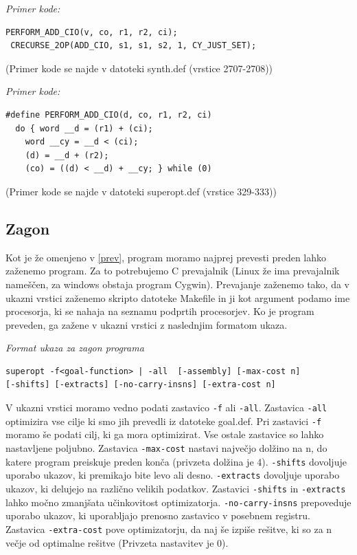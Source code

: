\documentclass[a4paper, 12pt]{book}
\begin{document}
				\medskip
				
				\noindent
				{\it Primer kode:}
				\begin{Verbatim}[baselinestretch=1]
 PERFORM_ADD_CIO(v, co, r1, r2, ci);
 CRECURSE_2OP(ADD_CIO, s1, s1, s2, 1, CY_JUST_SET);
				\end{Verbatim}
				\noindent
				{\small (Primer kode se najde v datoteki synth.def (vrstice 2707-2708))}
				\medskip
				
				\noindent
{\it Primer kode:}
\begin{Verbatim}[baselinestretch=1]
#define PERFORM_ADD_CIO(d, co, r1, r2, ci) 
  do { word __d = (r1) + (ci);                                          
    word __cy = __d < (ci);                                          
    (d) = __d + (r2);                                                
    (co) = ((d) < __d) + __cy; } while (0)
\end{Verbatim}
%
\noindent
{\small (Primer kode se najde v datoteki superopt.def (vrstice 329-333))}
	 
	\subsection{Zagon}
	Kot je že omenjeno v \ref{prev}, program moramo najprej prevesti preden lahko zaženemo program. Za to potrebujemo C prevajalnik (Linux že ima prevajalnik nameščen, za windows obstaja program Cygwin). Prevajanje zaženemo tako, da v  ukazni vrstici zaženemo skripto datoteke Makefile in ji kot argument podamo ime procesorja, ki se nahaja na seznamu podprtih procesorjev. Ko je program preveden, ga zažene v ukazni vrstici z naslednjim formatom ukaza.
	\medskip
	
	\noindent
	{\it Format ukaza za zagon programa}
\begin{Verbatim}[baselinestretch=1]
superopt -f<goal-function> | -all  [-assembly] [-max-cost n]
[-shifts] [-extracts] [-no-carry-insns] [-extra-cost n]
\end{Verbatim}

	V ukazni vrstici moramo vedno podati zastavico \texttt{-f} ali \texttt{-all}. Zastavica \texttt{-all} optimizira vse cilje ki smo jih prevedli iz datoteke goal.def. Pri zastavici \texttt{-f} moramo še podati cilj, ki ga mora optimizirat. Vse ostale zastavice so lahko nastavljene poljubno. Zastavica \texttt{-max-cost} nastavi največjo dolžino na n, do katere program preiskuje preden konča (privzeta dolžina je 4). \texttt{-shifts} dovoljuje uporabo ukazov, ki premikajo bite levo ali desno. \texttt{-extracts} dovoljuje uporabo ukazov, ki delujejo na različno velikih podatkov. Zastavici \texttt{-shifts} in \texttt{-extracts} lahko močno zmanjšata učinkovitost optimizatorja. \texttt{-no-carry-insns} prepoveduje uporabo ukazov, ki uporabljajo prenosno zastavico v posebnem registru. Zastavica \texttt{-extra-cost} pove optimizatorju, da naj še izpiše rešitve, ki so za n večje od optimalne rešitve (Privzeta nastavitev je 0).
	\medskip
	
\end{document}
